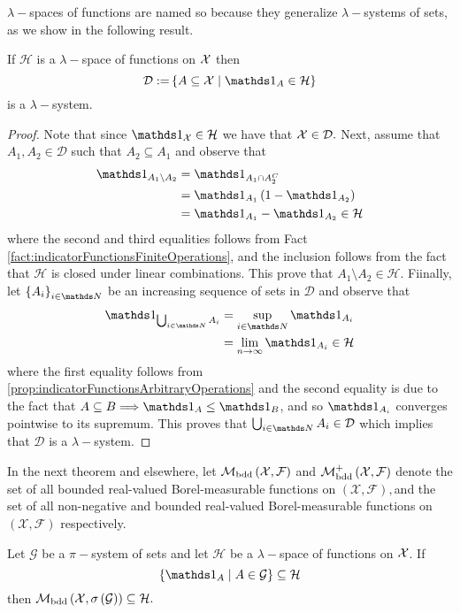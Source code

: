 $\lambda-$spaces of functions are named so because they generalize
$\lambda-$systems of sets, as we show in the following result.
\begin{prop}
\label{prop:lambdaFuncsGeneralizeLambdaSystems} If $\mathcal{H}$
is a $\lambda-$space of functions on $\mathcal{X}$ then
\[
\mathcal{D:=}\left\{ A\subseteq\X\mid\indicate_{A}\in\mathcal{H}\right\} 
\]
is a $\lambda-$system.
\end{prop}

\begin{proof}
Note that since $\indicate_{\X}\in\mathcal{H}$ we have that $\mathcal{X}\in\mathcal{D}.$
Next, assume that $A_{1},A_{2}\in\mathcal{D}$ such that $A_{2}\subseteq A_{1}$
and observe that
\begin{align*}
\indicate_{A_{1}\setminus A_{2}} & =\indicate_{A_{1}\cap A_{2}^{C}}\\
 & =\indicate_{A_{1}}\left(1-\indicate_{A_{2}}\right)\\
 & =\indicate_{A_{1}}-\indicate_{A_{2}}\in\mathcal{H}
\end{align*}
where the second and third equalities follows from Fact \ref{fact:indicatorFunctionsFiniteOperations},
and the inclusion follows from the fact that $\mathcal{H}$ is closed
under linear combinations. This prove that $A_{1}\setminus A_{2}\in\mathcal{H}$.
Fiinally, let $\left\{ A_{i}\right\} _{i\in\N}$ be an increasing
sequence of sets in $\mathcal{D}$ and observe that
\begin{align*}
\indicate_{\bigcup_{i\in\N}A_{i}} & =\sup_{i\in\N}\indicate_{A_{i}}\\
 & =\lim_{n\to\infty}\indicate_{A_{i}}\in\mathcal{H}
\end{align*}
where the first equality follows from \ref{prop:indicatorFunctionsArbitraryOperations}
and the second equality is due to the fact that $A\subseteq B\Longrightarrow\indicate_{A}\leq\indicate_{B}$,
and so $\indicate_{A_{i}}$ converges pointwise to its supremum. This
proves that $\bigcup_{i\in\N}A_{i}\in\mathcal{D}$ which implies that
$\mathcal{D}$ is a $\lambda-$system.
\end{proof}
In the next theorem and elsewhere, let $\mathcal{M}_{\text{bdd}}\left(\mathcal{X},\mathcal{F}\right)$
and $\mathcal{M}_{\text{bdd}}^{+}\left(\mathcal{X},\mathcal{F}\right)$ denote
the set of all bounded real-valued Borel-measurable functions on $\left(\mathcal{X},\mathcal{F}\right),$and
the set of all non-negative and bounded real-valued Borel-measurable
functions on $\left(\mathcal{X},\mathcal{F}\right)$ respectively.
\begin{thm}
\label{thm:piLambdaThmFunctions} Let $\mathcal{G}$ be a $\pi-$system
of sets and let $\mathcal{H}$ be a $\lambda-$space of functions
on $\mathcal{X}$. If
\[
\left\{ \indicate_{A}\mid A\in\mathcal{G}\right\} \subseteq\mathcal{H}
\]
then $\mathcal{M}_{\textnormal{bdd}}\left(\mathcal{X},\sigma\left(\mathcal{G}\right)\right)\subseteq\mathcal{H}.$
\end{thm}

